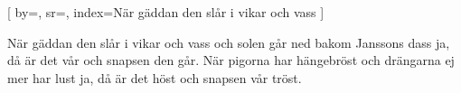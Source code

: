 
[ 		
	by={},					%
	sr={},					%
	index={När gäddan den slår i vikar och vass} %
	]				
	
\beginverse*						%
När gäddan den slår i vikar och vass 
och solen går ned bakom Janssons dass
ja, då är det vår
och snapsen den går.
När pigorna har hängebröst
och drängarna ej mer har lust
ja, då är det höst
och snapsen vår tröst.
\endverse					%

\endsong							%